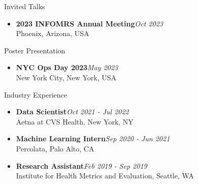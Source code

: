 \documentclass{resume} %
\begin{document}
\begin{rSection}{Invited Talks}
\begin{itemize}
\item {\bf 2023 INFOMRS Annual Meeting}\hfill {\em Oct 2023}\\
Phoenix, Arizona, USA
\end{itemize}
\end{rSection}

\begin{rSection}{Poster Presentation}
\begin{itemize}
\item {\bf NYC Ops Day 2023}\hfill {\em May 2023}\\
New York City, New York, USA
\end{itemize}
\end{rSection}

\begin{rSection}{Industry Experience}
\begin{itemize}
\item {\bf Data Scientist}\hfill {\em Oct 2021 - Jul 2022}\\
Aetna at CVS Health, New York, NY
\item {\bf Machine Learning Intern}\hfill {\em Sep 2020 - Jun 2021}\\
Percolata, Palo Alto, CA
\item {\bf Research Assistant}\hfill {\em Feb 2019 - Sep 2019}\\
Institute for Health Metrics and Evaluation, Seattle, WA
\end{itemize}
\end{rSection}
\end{document}

